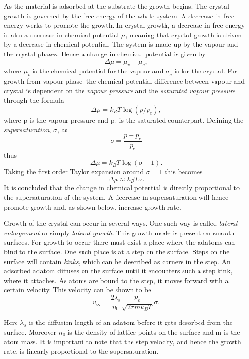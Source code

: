  As the material is adsorbed at the substrate the growth begins. The crystal growth is governed by the free energy of the whole system. A decrease in free energy works to promote the growth. In crystal growth, a decrease in free energy is also a decrease in chemical potential $\mu$, meaning that crystal growth is driven by a decrease in chemical potential. The system is made up by the vapour and the crystal phases. Hence a change in chemical potential is given by 
 \[\Delta \mu = \mu_v -\mu_c,\]
where $\mu_v$ is the chemical potential for the vapour and $\mu_c$ is for the crystal. For growth from vapour phase, the chemical potential difference between vapour and crystal is dependent on the \emph{vapour pressure} and the \emph{saturated vapour pressure} through the formula
 \[\Delta \mu = k_BT\log(p/p_e),\]
where p is the vapour pressure and p$_e$ is the saturated counterpart. Defining the \emph{supersaturation}, $\sigma$, as
\[\sigma = \frac{p-p_e}{p_e}\]
thus
 \[\Delta \mu = k_BT\log(\sigma+1).\]
Taking the first order Taylor expansion around $\sigma = 1$ this becomes
\[\Delta \mu \approx k_BT\sigma.\]
 It is concluded that the change in chemical potential is directly proportional to the supersaturation of the system. A decrease in supersaturation will hence promote growth and, as shown below, increase growth rate. 
 
 Growth of the crystal can occur in several ways. One such way is called \emph{lateral enlargement} or simply \emph{lateral growth}. This growth mode is present on smooth surfaces. For growth to occur there must exist a place where the adatoms can bind to the surface. One such place is at a step on the surface. Steps on the surface will contain \emph{kinks}, which can be described as corners in the step. An adsorbed adatom diffuses on the surface until it encounters such a step kink, where it attaches. As atoms are bound to the step, it moves forward with a certain velocity. This velocity can be shown \cite{Scheel2003} to be
\[v_{\infty} = \frac{2\lambda_s}{n_0}\frac{p_e}{\sqrt{2\pi mk_BT}}\sigma.\]

Here $\lambda_s$ is the diffusion length of an adatom before it gets desorbed from the surface. Moreover $n_0$ is the density of lattice points on the surface and m is the atom mass. It is important to note that the step velocity, and hence the growth rate, is linearly proportional to the supersaturation. 
 
 

 


 
 
 
 
 
 
 
 
 
 
 
 
 
 
 
 
 
 
 
 
 
 
 
 
 
 
 
 
 
 
 
 
 
 
 
 
 
 
 
 
 
 
 